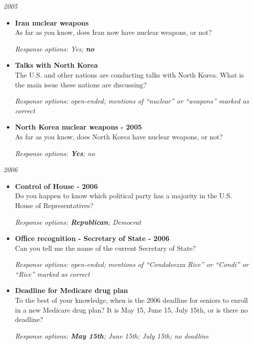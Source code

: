 \documentclass[12pt, letterpaper]{article}
\begin{document}
 \large \noindent \textit{2005} 
\normalsize

\begin{itemize}
\item \textbf{Iran nuclear weapons}\\
As far as you know, does Iran now have nuclear weapons, or not? 

\textit{Response options: Yes; \textbf{no}} 
\end{itemize}

\begin{itemize}
\item \textbf{Talks with North Korea}\\
The U.S. and other nations are conducting talks with North Korea. What is the main issue these nations are discussing? 

\textit{Response options: open-ended; mentions of ``nuclear'' or ``weapons'' marked as correct} 
\end{itemize}

\begin{itemize}
\item \textbf{North Korea nuclear weapons - 2005}\\
As far as you know, does North Korea have nuclear weapons, or not? 

\textit{Response options: \textbf{Yes}; no} 
\end{itemize}

 \large \noindent \textit{2006} 
\normalsize

\begin{itemize}
\item \textbf{Control of House - 2006}\\
Do you happen to know which political party has a majority in the U.S. House of Representatives? 

\textit{Response options: \textbf{Republican}; Democrat} 
\end{itemize}

\begin{itemize}
\item \textbf{Office recognition - Secretary of State - 2006}\\
Can you tell me the name of the current Secretary of State?

\textit{Response options: open-ended; mentions of ``Condoleezza Rice'' or ``Condi'' or ``Rice'' marked as correct} 
\end{itemize}

\begin{itemize}
\item \textbf{Deadline for Medicare drug plan}\\
To the best of your knowledge, when is the 2006 deadline for seniors to enroll in a new Medicare drug plan? It is May 15, June 15, July 15th, or is there no deadline?

\textit{Response options: \textbf{May 15th}; June 15th; July 15th; no deadline} 
\end{itemize}
\end{document}
